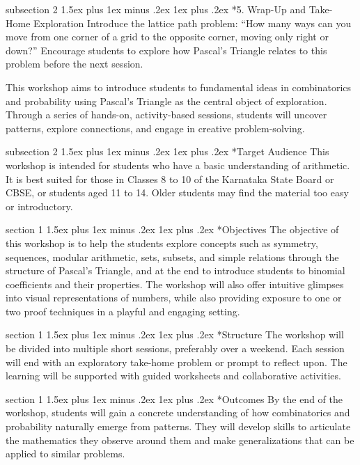 \documentclass[a4paper,twoside,notitlepage,
11pt,
]{amsart}
\makeatletter
\renewcommand{\section}{\@startsection
  {section}%
  {1}%
  {\z@}%
  {1.5ex plus 1ex minus .2ex}%
  {1ex plus .2ex}%
  {\normalfont\bfseries}}%
\renewcommand{\subsection}{\@startsection
    {subsection}%
    {2}%
    {\z@}%
    {1.5ex plus 1ex minus .2ex}%
    {1ex plus .2ex}%
    {\normalfont\itshape}}%
\makeatother
\begin{document}
\subsection*{5. Wrap-Up and Take-Home Exploration}
Introduce the lattice path problem: ``How many ways can you move from one corner of a grid to the opposite corner, moving only right or down?'' Encourage students to explore how Pascal's Triangle relates to this problem before the next session.



This workshop aims to introduce students to fundamental ideas in combinatorics and probability using Pascal's Triangle as the central object of exploration. Through a series of hands-on, activity-based sessions, students will uncover patterns, explore connections, and engage in creative problem-solving.

\subsection*{Target Audience}
This workshop is intended for students who have a basic understanding of arithmetic. It is best suited for those in Classes 
8 to 10 of the Karnataka State Board or CBSE, or students aged 11 to 14. Older students may find the material too easy or introductory.

\section*{Objectives}
The objective of this workshop is to help the students explore concepts such as symmetry, sequences, modular arithmetic, sets, subsets, and simple relations through the structure of Pascal's Triangle, and at the end to introduce students to binomial coefficients and their properties. The workshop will also offer intuitive glimpses into visual representations of numbers, while also providing exposure to one or two proof techniques in a playful and engaging setting.

\section*{Structure}
The workshop will be divided into multiple short sessions, preferably over a weekend. Each session will end with an exploratory take-home problem or prompt to reflect upon. The learning will be supported with guided worksheets and collaborative activities.

\section*{Outcomes}
By the end of the workshop, students will gain a concrete understanding of how combinatorics and probability naturally emerge from patterns. They will develop skills to articulate the mathematics they observe around them and make generalizations that can be applied to similar problems.
\end{document}
